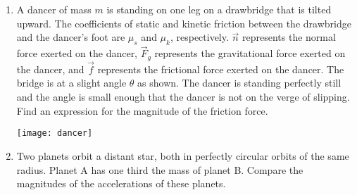 \documentclass[11pt]{article}
\begin{document}
\begin{enumerate}
\vspace{.75in}

\item A dancer of mass $m$ is standing on one leg on a drawbridge that is tilted upward. The coefficients of static and kinetic friction between the drawbridge and the dancer's foot are $\mu_s$ and $\mu_k$, respectively. $\vec{n}$ represents the normal force exerted on the dancer, $\vec{F}_g$ represents the gravitational force exerted on the dancer, and $\vec{f}$ represents the frictional force exerted on the dancer. The bridge is at a slight angle $\theta$ as shown. The dancer is standing perfectly still and the angle is small enough that the dancer is not on the verge of slipping. Find an expression for the magnitude of the friction force.\\
\begin{minipage}[t]{.45\lw}
\end{minipage}\hfill
\begin{minipage}[t]{.5\lw}
\vspace{0in}
\flushright
\texttt{[image: dancer]}
\end{minipage}

\newpage

\item Two planets orbit a distant star, both in perfectly circular orbits of the same radius. Planet A has one third the mass of planet B. Compare the magnitudes of the accelerations of these planets.


\end{enumerate}
\end{document}
